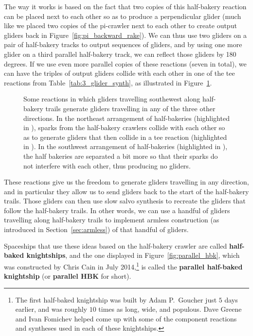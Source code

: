 The way it works is based on the fact that two copies of this half-bakery reaction can be placed next to each other so as to produce a perpendicular glider (much like we placed two copies of the pi-crawler next to each other to create output gliders back in Figure~\ref{fig:pi_backward_rake}). We can thus use two gliders on a pair of half-bakery tracks to output sequences of gliders, and by using one more glider on a third parallel half-bakery track, we can reflect those gliders by 180 degrees. If we use even more parallel copies of these reactions (seven in total), we can have the triples of output gliders collide with each other in one of the tee reactions from Table~\ref{tab:3_glider_synth}, as illustrated in Figure~\ref{fig:hbk_reactions}.

\begin{figure}[!htb]
	\centering
	\caption{Some reactions in which gliders travelling southewest along half-bakery trails generate gliders travelling in any of the three other directions. In the northeast arrangement of half-bakeries (highlighted in ), sparks from the half-bakery crawlers collide with each other so as to generate gliders that then collide in a tee reaction (highlighted in ). In the southwest arrangement of half-bakeries (highlighted in ), the half bakeries are separated a bit more so that their sparks do not interfere with each other, thus producing no gliders.}\label{fig:hbk_reactions}
\end{figure}

These reactions give us the freedom to generate gliders travelling in any direction, and in particular they allow us to send gliders back to the start of the half-bakery trails. Those gliders can then use slow salvo synthesis to recreate the gliders that follow the half-bakery trails. In other words, we can use a handful of gliders travelling along half-bakery trails to implement armless construction (as introduced in Section~\ref{sec:armless}) of that handful of gliders.

Spaceships that use these ideas based on the half-bakery crawler are called \textbf{half-baked knightships}, and the one displayed in Figure~\ref{fig:parallel_hbk}, which was constructed by Chris Cain in July 2014,\footnote{The first half-baked knightship was built by Adam P.~Goucher just $5$ days earlier, and was roughly $10$ times as long, wide, and populous. Dave Greene and Ivan Fomichev helped come up with some of the component reactions and syntheses used in each of these knightships.} is called the \textbf{parallel half-baked knightship} (or \textbf{parallel HBK} for short).

